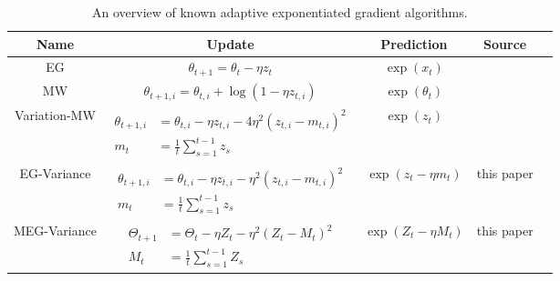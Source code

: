 \documentclass[paper_icml.tex]{subfiles}
\begin{document}
\begin{table*}
\begin{center}
\begin{tabular}{|c|c|c|c|c|}
\hline 
Name & Update & Prediction & Source \\
\hline 
EG & $\theta_{t+1} = \theta_t - \eta z_t$ & $\exp(x_t)$ & \cite{kivinen1997} \\
\hline 
MW & $\theta_{t+1,i} = \theta_{t,i} + \log(1 - \eta z_{t,i})$ & $\exp(\theta_t)$ & \cite{cesa2007} \\
\hline 
Variation-MW & $\begin{array}{rl} \theta_{t+1,i} &= \theta_{t,i} - \eta z_{t,i} - 4\eta^2 (z_{t,i}-m_{t,i})^2 \\ m_t &= \frac{1}{t} \sum_{s=1}^{t-1} z_s \end{array}$ & $\exp(z_t)$ & \cite{hazan2010variation} \\
\hline 
EG-Variance & $\begin{array}{rl} \theta_{t+1,i} &= \theta_{t,i} - \eta z_{t,i} - \eta^2 (z_{t,i}-m_{t,i})^2 \\ m_t &= \frac{1}{t} \sum_{s=1}^{t-1} z_s \end{array}$ & $\exp(z_t - \eta m_t)$ & this paper \\
 \hline 
MEG-Variance & $\begin{array}{rl} \Theta_{t+1} &= \Theta_t - \eta Z_t - \eta^2 (Z_t - M_t)^2 \\ M_t &= \frac{1}{t} \sum_{s=1}^{t-1} Z_s \end{array}$ & $\exp(Z_t - \eta M_t)$ & this paper \\
 \hline 
\end{tabular}
\end{center}
\caption{An overview of known adaptive exponentiated gradient algorithms.}
\label{tab:algorithms}
\end{table*}
\end{document}
